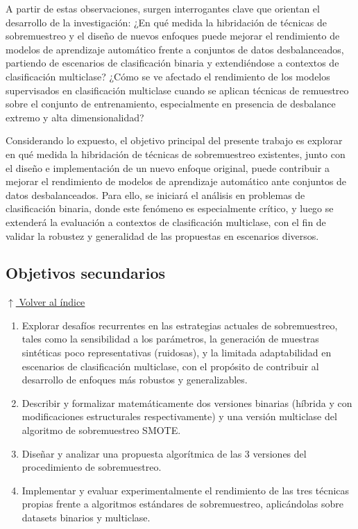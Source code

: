 \documentclass[12pt,a4paper]{article}
\begin{document}
A partir de estas observaciones, surgen interrogantes clave que orientan el desarrollo de la investigación:
¿En qué medida la hibridación de técnicas de sobremuestreo y el diseño de nuevos enfoques puede mejorar el rendimiento de modelos de aprendizaje automático frente a conjuntos de datos desbalanceados, partiendo de escenarios de clasificación binaria y extendiéndose a contextos de clasificación multiclase?
¿Cómo se ve afectado el rendimiento de los modelos supervisados en clasificación multiclase cuando se aplican técnicas de remuestreo sobre el conjunto de entrenamiento, especialmente en presencia de desbalance extremo y alta dimensionalidad?

Considerando lo expuesto, el objetivo principal del presente trabajo es explorar en qué medida la hibridación de técnicas de sobremuestreo existentes, junto con el diseño e implementación de un nuevo enfoque original, puede contribuir a mejorar el rendimiento de modelos de aprendizaje automático ante conjuntos de datos desbalanceados. Para ello, se iniciará el análisis en problemas de clasificación binaria, donde este fenómeno es especialmente crítico, y luego se extenderá la evaluación a contextos de clasificación multiclase, con el fin de validar la robustez y generalidad de las propuestas en escenarios diversos.

\subsection{Objetivos secundarios} \noindent\hyperlink{toc}{\small$\uparrow$ Volver al índice}
\begin{enumerate}
    \item Explorar desafíos recurrentes en las estrategias actuales de sobremuestreo, tales como la sensibilidad a los parámetros, la generación de muestras sintéticas poco representativas (ruidosas), y la limitada adaptabilidad en escenarios de clasificación multiclase, con el propósito de contribuir al desarrollo de enfoques más robustos y generalizables. 
    \item Describir y formalizar matemáticamente dos versiones binarias (híbrida y con modificaciones estructurales respectivamente) y una versión multiclase del algoritmo de sobremuestreo SMOTE.
    \item Diseñar y analizar una propuesta algorítmica de las 3 versiones del procedimiento de sobremuestreo.
    \item Implementar y evaluar experimentalmente el rendimiento de las tres técnicas propias frente a algoritmos estándares de sobremuestreo, aplicándolas sobre datasets binarios y multiclase.
\end{enumerate}
\end{document}

